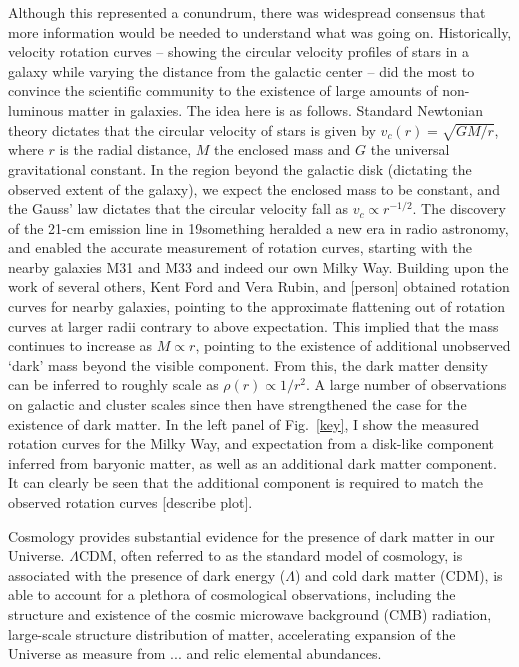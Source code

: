 Although this represented a conundrum, there was widespread consensus that more information would be needed to understand what was going on. Historically, velocity rotation curves -- showing the circular velocity profiles of stars in a galaxy while varying the distance from the galactic center -- did the most to convince the scientific community to the existence of large amounts of non-luminous matter in galaxies. The idea here is as follows. Standard Newtonian theory dictates that the circular velocity of stars is given by $v_c(r) = \sqrt{GM/r}$, where $r$ is the radial distance, $M$ the enclosed mass and $G$ the universal gravitational constant. In the region beyond the galactic disk (dictating the observed extent of the galaxy), we expect the enclosed mass to be constant, and the Gauss' law dictates that the circular velocity fall as $v_c \propto r^{-1/2}$. The discovery of the 21-cm emission line in 19something heralded a new era in radio astronomy, and enabled the accurate measurement of rotation curves, starting with the nearby galaxies M31 and M33 and indeed our own Milky Way. Building upon the work of several others, Kent Ford and Vera Rubin, and [person] obtained rotation curves for nearby galaxies, pointing to the approximate flattening out of rotation curves at larger radii contrary to above expectation. This implied that the mass continues to increase as $M \propto r$, pointing to the existence of additional unobserved `dark' mass beyond the visible component. From this, the dark matter density can be inferred to roughly scale as $\rho(r) \propto 1/r^2$. A large number of observations on galactic and cluster scales since then have strengthened the case for the existence of dark matter. In the left panel of Fig.~\ref{key}, I show the measured rotation curves for the Milky Way, and expectation from a disk-like component inferred from baryonic matter, as well as an additional dark matter component. It can clearly be seen that the additional component is required to match the observed rotation curves [describe plot].



Cosmology provides substantial evidence for the presence of dark matter in our Universe. $\Lambda$CDM, often referred to as the standard model of cosmology, is associated with the presence of dark energy ($\Lambda$) and cold dark matter (CDM), is able to account for a plethora of cosmological observations, including the structure and existence of the cosmic microwave background (CMB) radiation, large-scale structure distribution of matter, accelerating expansion of the Universe as measure from ... and relic elemental abundances. 

